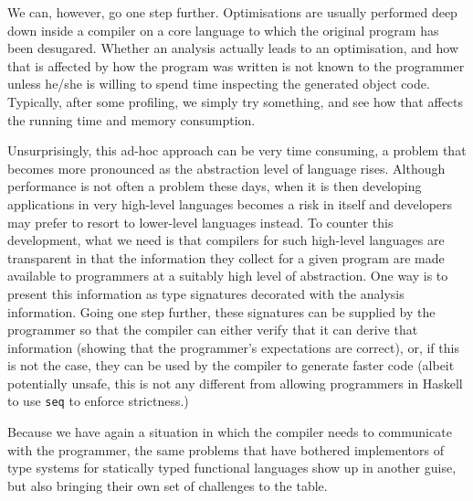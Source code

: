 \documentclass[sigplan,10pt,noacm]{acmart}
\begin{document}
We can, however, go one step further. Optimisations are usually performed
deep down inside a compiler on a core language to which
the original program has been desugared. Whether an analysis actually
leads to an optimisation, and how that is affected by how the program
was written is not known to the programmer unless he/she is willing
to spend time inspecting the generated object code. Typically, 
after some profiling, we simply try something, and see how that affects 
the running time and memory consumption.

Unsurprisingly, this ad-hoc approach can be very time consuming, a problem
that becomes more pronounced as the abstraction level of language rises.
Although performance is not often a problem these days, when it is then developing
applications in very high-level languages becomes a risk in itself 
and developers may prefer to resort to lower-level languages instead. 
To counter this development,
what we need is that compilers for such high-level languages are transparent in that the 
information they collect for a given program are made available to programmers 
at a suitably high level of abstraction. One way is to present this information
as type signatures decorated with the analysis information. Going one step
further, these signatures can be supplied by the programmer so that
the compiler can either verify that it can derive that information (showing
that the programmer's expectations are correct), or, if this is not the case,
they can be used by the compiler to generate faster code 
(albeit potentially unsafe, this
is not any different from allowing programmers in Haskell to use
\texttt{seq} to enforce strictness.)

Because we have again a situation in which the compiler needs to communicate
with the programmer, the same problems that have bothered implementors of type systems
for statically typed functional languages show up in another guise,
but also bringing their own set of challenges to the table.


\end{document}
